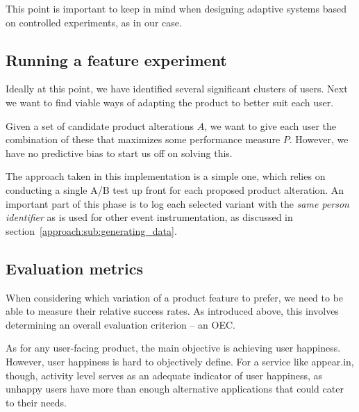 This point is important to keep in mind when designing adaptive systems based on controlled experiments, as in our case.

\subsection{Running a feature experiment}
\label{approach:running_feature_experiment}

Ideally at this point, we have identified several significant clusters of users. Next we want to find viable ways of adapting the product to better suit each user.

Given a set of candidate product alterations $A$, we want to give each user the combination of these that maximizes some performance measure $P$. However, we have no predictive bias to start us off on solving this.

The approach taken in this implementation is a simple one, which relies on conducting a single A/B test up front for each proposed product alteration. An important part of this phase is to log each selected variant with the \emph{same person identifier} as is used for other event instrumentation, as discussed in section~\ref{approach:sub:generating_data}.


\subsection{Evaluation metrics} %
\label{approach:sec:evaluation_metrics}

When considering which variation of a product feature to prefer, we need to be able to measure their relative success rates. As introduced above, this involves determining an overall evaluation criterion -- an OEC.

As for any user-facing product, the main objective is achieving user happiness. However, user happiness is hard to objectively define. For a service like appear.in, though, activity level serves as an adequate indicator of user happiness, as unhappy users have more than enough alternative applications that could cater to their needs.


